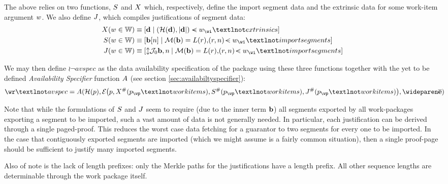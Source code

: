 The above relies on two functions, $S$ and $X$ which, respectively, define the import segment data and the extrinsic data for some work-item argument $w$. We also define $J$, which compiles justifications of segment data:
\begin{equation}
  \begin{aligned}
    \extrinsicdata(\wiX \in \workitem) &\equiv \sq{\build{\mathbf{d}}{(\blake{\mathbf{d}}, \len{\mathbf{d}}) \orderedin \wiX_\wi¬extrinsics}} \\
    \importsegmentdata(\wiX \in \workitem) &\equiv \sq{\build{\segsX\subb{n}}{\merklizecd{\segsX} = \segrootlookup(r), \tup{r, n} \orderedin \wiX_\wi¬importsegments}} \\
    \justifysegmentdata(\wiX \in \workitem) &\equiv \sq{\build{\var{\fnmerklejustsubpath{0}{\segsX, n}}}{\merklizecd{\segsX} = \segrootlookup(r), \tup{r, n} \orderedin \wiX_\wi¬importsegments}}
  \end{aligned}
\end{equation}

We may then define $\wr¬avspec$ as the data availability specification of the package using these three functions together with the yet to be defined \emph{Availability Specifier} function $A$ (see section \ref{sec:availabiltyspecifier}):
\begin{equation}
  \wr¬avspec = \newavailabilityspecifier(
    \blake{\wpX},
    \encode{
      \wpX,
      \extrinsicdata^\#(\wpX_\wp¬workitems),
      \importsegmentdata^\#(\wpX_\wp¬workitems),
      \justifysegmentdata^\#(\wpX_\wp¬workitems)
    },
    \concatall{\allexports}
  )\!\!\!\!
\end{equation}

Note that while the formulations of $S$ and $J$ seem to require (due to the inner term $\mathbf{b}$) all segments exported by all work-packages exporting a segment to be imported, such a vast amount of data is not generally needed. In particular, each justification can be derived through a single paged-proof. This reduces the worst case data fetching for a guarantor to two segments for every one to be imported. In the case that contiguously exported segments are imported (which we might assume is a fairly common situation), then a single proof-page should be sufficient to justify many imported segments.

Also of note is the lack of length prefixes: only the Merkle paths for the justifications have a length prefix. All other sequence lengths are determinable through the work package itself.

